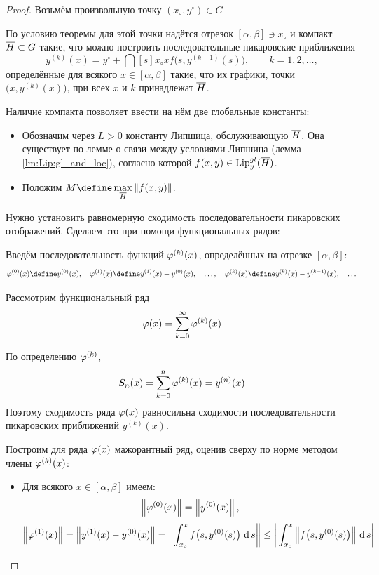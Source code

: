 \begin{proof}
	Возьмём произвольную точку $ (x_\circ, y^\circ) \in G $

    По условию теоремы для этой точки надётся отрезок $ [\alpha, \beta] \ni x_\circ $ и компакт $ \ol H \sub G $ такие, что можно построить последовательные пикаровские приближения
    $$ y^{(k)}(x) = y^\circ + \dint[s]{x_\circ}x{ f \big( s, y^{(k - 1)}(s) \big)}, \qquad k = 1, 2, \dots, $$
    определённые для всякого $ x \in [\alpha, \beta] $ такие, что их графики, \ie точки $ \big( x, y^{(k)}(x) \big) $, при всех $ x $ и $ k $ принадлежат $ \ol H $.

    Наличие компакта позволяет ввести на нём две глобальные константы:
    \begin{itemize}
        \item Обозначим через $ L > 0 $ константу Липшица, обслуживающую $ \ol H $. Она существует по лемме о связи между условиями Липшица (лемма \ref{lm:Lip:gl_and_loc}), согласно которой $ f(x, y) \in \operatorname{Lip}_y^{gl}(\ol H) $.
        \item Положим $ M \define \max\limits_{\ol H}\norm{f(x, y)} $.
    \end{itemize}

    Нужно установить равномерную сходимость последовательности пикаровских отображений. Сделаем это при помощи функциональных рядов:

    Введём последовательность функций $ \vphi^{(k)}(x) $, определённых на отрезке $ [\alpha, \beta] $:
    $$ \vphi^{(0)}(x) \define y^{(0)}(x), \quad \vphi^{(1)}(x) \define y^{(1)}(x) - y^{(0)}(x), \quad \dots, \quad \vphi^{(k)}(x) \define y^{(k)}(x) - y^{(k - 1)}(x), \quad \dots $$

    Рассмотрим функциональный ряд
    $$ \vphi(x) = \sum_{k = 0}^\infty \vphi^{(k)}(x) $$

    По определению $ \vphi^{(k)} $,
    $$ S_n(x) = \sum_{k = 0}^n \vphi^{(k)}(x) = y^{(n)}(x) $$
    Поэтому сходимость ряда $ \vphi(x) $ равносильна сходимости последовательности пикаровских приближений $ y^{(k)}(x) $.

    Построим для ряда $ \vphi(x) $ мажорантный ряд, оценив сверху по норме методом  члены $ \vphi^{(k)}(x) $:

    \begin{itemize}
        \item {}

        Для всякого $ x \in [\alpha, \beta] $ имеем:
        $$ \norm{\vphi^{(0)}(x)} = \norm{y^{(0)}(x)}, $$
        $$ \norm{\vphi^{(1)}(x)} = \norm{y^{(1)}(x) - y^{(0)}(x)} = \norm{\dint[s]{x_\circ}x{f \big( s, y^{(0)}(s) \big)}} \le \bigg| \dint[s]{x_\circ}x{\norm{f \big( s, y^{(0)}(s) \big)}} \bigg| $$


\end{itemize}
\end{proof}
